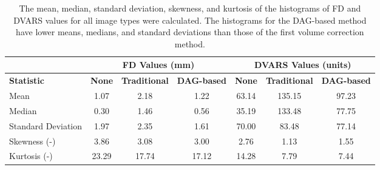 \begin{table}[th]
\centering
\caption{The mean, median, standard deviation, skewness, and kurtosis of the histograms of FD and DVARS values for all image types were calculated. The histograms for the DAG-based method have lower means, medians, and standard deviations than those of the first volume correction method.}
\label{tab:hists}
\begin{tabular}{|l|c|c|c|c|c|c|}
\hline
                                    & \multicolumn{3}{c|}{\textbf{FD Values (mm)}}                                                                                         & \multicolumn{3}{c|}{\textbf{DVARS Values (units)}}                                                                                   \\ \hline
\textbf{Statistic}    & \multicolumn{1}{l|}{\textbf{None}}         & \multicolumn{1}{l|}{\textbf{Traditional}}  & \multicolumn{1}{l|}{\textbf{DAG-based}}    & \multicolumn{1}{l|}{\textbf{None}}         & \multicolumn{1}{l|}{\textbf{Traditional}}  & \multicolumn{1}{l|}{\textbf{DAG-based}}    \\ \hline
Mean                                & 1.07                                       & 2.18                                       & 1.22                                       & 63.14                                      & 135.15                                     & 97.23                                      \\ \hline
Median                              & 0.30                                       & 1.46                                       & 0.56                                       & 35.19                                      & 133.48                                     & 77.75                                      \\ \hline
Standard Deviation                  & 1.97                                       & 2.35                                       & 1.61                                       & 70.00                                      & 83.48                                      & 77.14                                      \\ \hline
Skewness (-)                        & 3.86                                       & 3.08                                       & 3.00                                       & 2.76                                       & 1.13                                       & 1.55                                       \\ \hline
Kurtosis (-)                        & 23.29                                      & 17.74                                      & 17.12                                      & 14.28                                      & 7.79                                       & 7.44                                       \\ \hline
\end{tabular}
\end{table}

